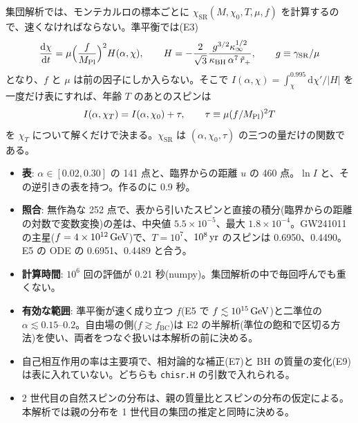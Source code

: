 集団解析では、モンテカルロの標本ごとに $\chi_\mathrm{SR}(M,\chi_0,T,\mu,f)$ を計算するので、速くなければならない。準平衡では(E3)
\begin{equation}
\frac{\mathrm{d}\chi}{\mathrm{d}t}=\mu\Bigl(\frac{f}{M_\mathrm{Pl}}\Bigr)^2H(\alpha,\chi),\qquad
H=-\frac{2}{\sqrt3}\frac{g^{3/2}\kappa_\infty^{1/2}}{\kappa_\mathrm{BH}\,\alpha^7\,\tilde r_+},\qquad g\equiv\gamma_\mathrm{SR}/\mu
\label{eq:e10_H}
\end{equation}
となり、$f$ と $\mu$ は前の因子にしか入らない。そこで $I(\alpha,\chi)=\int_\chi^{0.995}\mathrm{d}\chi'/|H|$ を一度だけ表にすれば、年齢 $T$ のあとのスピンは
\[
I(\alpha,\chi_T)=I(\alpha,\chi_0)+\tau,\qquad \tau\equiv\mu(f/M_\mathrm{Pl})^2T
\]
を $\chi_T$ について解くだけで決まる。$\chi_\mathrm{SR}$ は $(\alpha,\chi_0,\tau)$ の三つの量だけの関数である。

\begin{result}
\begin{itemize}
\item \textbf{表}: $\alpha\in[0.02,0.30]$ の 141 点と、臨界からの距離 $u$ の 460 点。$\ln I$ と、その逆引きの表を持つ。作るのに 0.9 秒。
\item \textbf{照合}: 無作為な 252 点で、表から引いたスピンと直接の積分(臨界からの距離の対数で変数変換)の差は、中央値 $5.5\times10^{-5}$、最大 $1.8\times10^{-4}$。GW241011 の主星($f=4\times10^{12}\,\mathrm{GeV}$)で、$T=10^7$、$10^8\,\mathrm{yr}$ のスピンは 0.6950、0.4490。E5 の ODE の 0.6951、0.4489 と合う。
\item \textbf{計算時間}: $10^6$ 回の評価が 0.21 秒(numpy)。集団解析の中で毎回呼んでも重くない。
\item \textbf{有効な範囲}: 準平衡が速く成り立つ $f$(E5 で $f\lesssim10^{15}\,\mathrm{GeV}$)と二準位の $\alpha\lesssim0.15$--$0.2$。自由場の側($f\gtrsim f_\mathrm{BC}$)は E2 の半解析(準位の飽和で区切る方法)を使い、両者をつなぐ扱いは本解析の前に決める。
\end{itemize}
\end{result}

\begin{caveat}
\begin{itemize}
\item 自己相互作用の率は主要項で、相対論的な補正(E7)と BH の質量の変化(E9)は表に入れていない。どちらも \texttt{chisr.H} の引数で入れられる。
\item 2 世代目の自然スピンの分布は、親の質量比とスピンの分布の仮定による。本解析では親の分布を 1 世代目の集団の推定と同時に決める。
\end{itemize}
\end{caveat}
